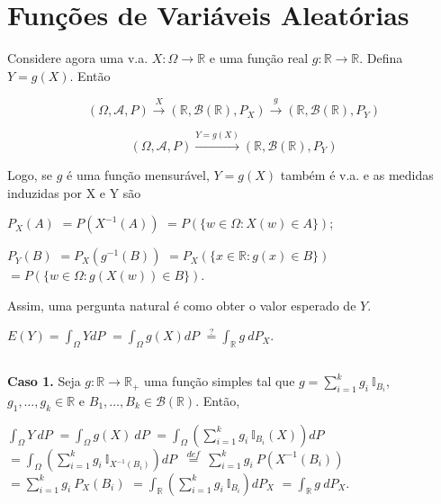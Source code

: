 \documentclass[
]{book}
\begin{document}
\(~\)

\(~\)

\hypertarget{funuxe7uxf5es-de-variuxe1veis-aleatuxf3rias}{%
\section{Funções de Variáveis Aleatórias}\label{funuxe7uxf5es-de-variuxe1veis-aleatuxf3rias}}

Considere agora uma v.a. \(X: \Omega \longrightarrow \mathbb{R}\) e uma função real \(g: \mathbb{R} \longrightarrow \mathbb{R}\). Defina \(Y = g(X)\). Então

\[(\Omega, \mathcal{A},P) \overset{X}{\longrightarrow}(\mathbb{R},\mathcal{B}(\mathbb{R}),P_X)\overset{g}{\longrightarrow}(\mathbb{R},\mathcal{B}(\mathbb{R}),P_Y)\]

\[(\Omega, \mathcal{A},P)\overset{Y = g(X)}{\longrightarrow}(\mathbb{R},\mathcal{B}(\mathbb{R}),P_Y)\]

Logo, se \(g\) é uma função mensurável, \(Y=g(X)\) também é v.a. e as medidas induzidas por X e Y são

\(P_X(A)\) \(= P(X^{-1}(A))\) \(= P\left(\{w \in \Omega : X(w) \in A\}\right)\);

\(P_Y(B)\) \(= P_X(g^{-1}(B))\) \(= P_X\left(\{x \in \mathbb{R} : g(x) \in B\}\right)\) \(= P\left(\{w \in \Omega : g\left(X(w)\right) \in B\}\right)\).

Assim, uma pergunta natural é como obter o valor esperado de \(Y\).

\(E(Y) = \displaystyle\int_\Omega YdP\) \(=\displaystyle\int_\Omega g(X)dP\) \(\overset{?}{=} \displaystyle\int_{\mathbb{R}}g~dP_X\).

\(~\)

\textbf{Caso 1.} Seja \(g:\mathbb{R}\longrightarrow\mathbb{R}_+\) uma função simples tal que \(g = \sum_{i=1}^kg_i~\mathbb{I}_{B_i}\), \(g_1,\ldots,g_k \in \mathbb{R}\) e \(B_1,\ldots,B_k \in \mathcal{B}(\mathbb{R})\). Então,

\(\displaystyle\int_\Omega Y~dP\)
\(=\displaystyle\int_\Omega g(X)~dP\)
\(=\displaystyle\int_\Omega \left(\sum_{i=1}^k g_i ~\mathbb{I}_{B_i}(X)\right)dP\)
\(=\displaystyle\int_\Omega \left(\sum_{i=1}^k g_i ~\mathbb{I}_{X^{-1}(B_i)}\right)dP\)
\(~\displaystyle\overset{def}{=}~\sum_{i=1}^k g_i~P(X^{-1}(B_i))\)
\(=\displaystyle\sum_{i=1}^k g_i~P_X(B_i)\)
\(=\displaystyle\int_{\mathbb{R}}\left(\sum_{i=1}^kg_i~\mathbb{I}_{B_i}\right)dP_X\)
\(=\displaystyle\int_{\mathbb{R}} g~dP_X\).

\(~\)
\end{document}
